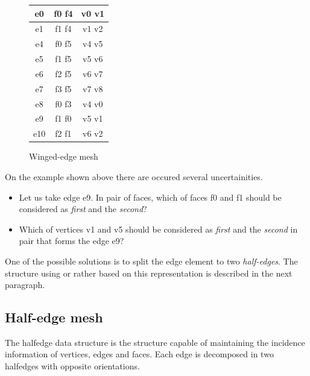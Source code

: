 \begin{figure}[!htbp]
\begin{minipage}[!htbp]{0.25\linewidth}
\begin{tabular}{|c|c|c|}
\hline
\textsf{e0} & \textsf{f0 f4} & \textsf{v0 v1}\\
\hline
\textsf{e1} & \textsf{f1 f4} & \textsf{v1 v2}\\
\hline
\textsf{e4} & \textsf{f0 f5} & \textsf{v4 v5}\\
\hline
\textsf{e5} & \textsf{f1 f5} & \textsf{v5 v6}\\
\hline
\textsf{e6} & \textsf{f2 f5} & \textsf{v6 v7}\\
\hline
\textsf{e7} & \textsf{f3 f5} & \textsf{v7 v8}\\
\hline
\textsf{e8} & \textsf{f0 f3} & \textsf{v4 v0}\\
\hline
\textsf{e9} & \textsf{f1 f0} & \textsf{v5 v1}\\
\hline
\textsf{e10} & \textsf{f2 f1} & \textsf{v6 v2}\\
\hline
\end{tabular}

\label{fig:figure2}
\end{minipage}

\caption{Winged-edge mesh}
\end{figure}

On the example shown above there are occured several uncertainities.

\begin{itemize}
\item Let us take edge \textsf{e9}. In pair of faces, which of faces \textsf{f0} and 
\textsf{f1} should be considered as \emph{first} and the \emph{second}?

\item Which of vertices \textsf{v1} and \textsf{v5} should be considered as 
\emph{first} and the \emph{second} in pair that forms the edge \textsf{e9}?
\end{itemize}

One of the possible solutions is to split the edge element to two \emph{half-edges}.
The structure using or rather based on this representation is described in the next
paragraph.

\subsection{Half-edge mesh}

The halfedge data structure is the structure capable of maintaining the incidence
information of vertices, edges and faces. Each edge is decomposed in two halfedges
with opposite orientations.
\\


